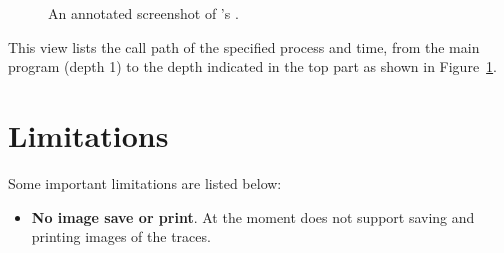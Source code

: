 \begin{figure}[t]
\caption{An annotated screenshot of \hpctraceviewer{}'s \callview.}
\label{fig:hpctraceviewer-callpath-legend}
\end{figure}

This view lists the call path of the specified process and time, from the main program (depth 1) to the depth indicated in the top part as shown in Figure~\ref{fig:hpctraceviewer-callpath-legend}.





\section{Limitations}

Some important \hpctraceviewer{} limitations are listed below:
\begin{itemize}

\item \textbf{No image save or print}.
	At the moment \hpctraceviewer{} does not support saving and printing images of the traces.


\end{itemize}

